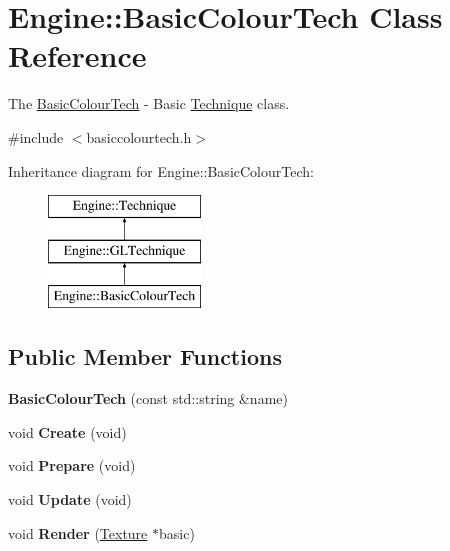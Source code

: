 \hypertarget{classEngine_1_1BasicColourTech}{}\section{Engine\+:\+:Basic\+Colour\+Tech Class Reference}
\label{classEngine_1_1BasicColourTech}


The \hyperlink{classEngine_1_1BasicColourTech}{Basic\+Colour\+Tech} -\/ Basic \hyperlink{classEngine_1_1Technique}{Technique} class.  




{\ttfamily \#include $<$basiccolourtech.\+h$>$}

Inheritance diagram for Engine\+:\+:Basic\+Colour\+Tech\+:\begin{figure}[H]
\begin{center}
\leavevmode
\includegraphics[height=3.000000cm]{classEngine_1_1BasicColourTech}
\end{center}
\end{figure}
\subsection*{Public Member Functions}
\begin{DoxyCompactItemize}
\item 
\hypertarget{classEngine_1_1BasicColourTech_aa6e9de1fc02b5e63ce95c94784090024}{}{\bfseries Basic\+Colour\+Tech} (const std\+::string \&name)\label{classEngine_1_1BasicColourTech_aa6e9de1fc02b5e63ce95c94784090024}

\item 
\hypertarget{classEngine_1_1BasicColourTech_a66ae830e78bdee64efe49b566da2f35e}{}void {\bfseries Create} (void)\label{classEngine_1_1BasicColourTech_a66ae830e78bdee64efe49b566da2f35e}

\item 
\hypertarget{classEngine_1_1BasicColourTech_adbabe9350d6d141703350e9870066b92}{}void {\bfseries Prepare} (void)\label{classEngine_1_1BasicColourTech_adbabe9350d6d141703350e9870066b92}

\item 
\hypertarget{classEngine_1_1BasicColourTech_a369eab1f7871a7b5045a33cca10e5c64}{}void {\bfseries Update} (void)\label{classEngine_1_1BasicColourTech_a369eab1f7871a7b5045a33cca10e5c64}

\item 
\hypertarget{classEngine_1_1BasicColourTech_a04d6c8a685d015645a121f41e4e99a6e}{}void {\bfseries Render} (\hyperlink{classEngine_1_1Texture}{Texture} $\ast$basic)\label{classEngine_1_1BasicColourTech_a04d6c8a685d015645a121f41e4e99a6e}

\end{DoxyCompactItemize}
